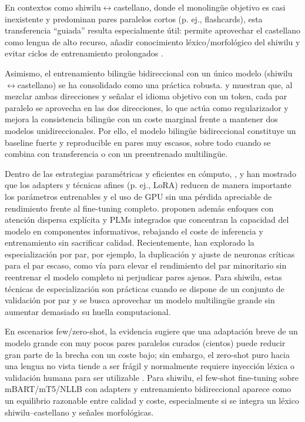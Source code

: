 \documentclass[12pt,a4paper,oneside]{book}
\begin{document}
En contextos como shiwilu$\leftrightarrow$castellano, donde el monolingüe objetivo es casi inexistente y predominan pares paralelos cortos (p. ej., flashcards), esta transferencia ``guiada'' resulta especialmente útil: permite aprovechar el castellano como lengua de alto recurso, añadir conocimiento léxico/morfológico del shiwilu y evitar ciclos de entrenamiento prolongados \parencite{montoya2019}.

Asimismo, el entrenamiento bilingüe bidireccional con un único modelo (shiwilu$\leftrightarrow$castellano) se ha consolidado como una práctica robusta. \textcite{liu2020mbart} y \textcite{desilva2024} muestran que, al mezclar ambas direcciones y señalar el idioma objetivo con un token, cada par paralelo se aprovecha en las dos direcciones, lo que actúa como regularizador y mejora la consistencia bilingüe con un coste marginal frente a mantener dos modelos unidireccionales. Por ello, el modelo bilingüe bidireccional constituye un baseline fuerte y reproducible en pares muy escasos, sobre todo cuando se combina con transferencia o con un preentrenado multilingüe.

Dentro de las estrategias paramétricas y eficientes en cómputo, \textcite{houlsby2019}, \textcite{hu2022lora} y \textcite{chronopoulou2023} han mostrado que los adapters y técnicas afines (p. ej., LoRA) reducen de manera importante los parámetros entrenables y el uso de GPU sin una pérdida apreciable de rendimiento frente al fine-tuning completo. \textcite{ning2024} proponen además enfoques con atención dispersa explícita y PLMs integrados que concentran la capacidad del modelo en componentes informativos, rebajando el coste de inferencia y entrenamiento sin sacrificar calidad. Recientemente, \textcite{qorbani2025} han explorado la especialización por par, por ejemplo, la duplicación y ajuste de neuronas críticas para el par escaso, como vía para elevar el rendimiento del par minoritario sin reentrenar el modelo completo ni perjudicar pares ajenos. Para shiwilu, estas técnicas de especialización son prácticas cuando se dispone de un conjunto de validación por par y se busca aprovechar un modelo multilingüe grande sin aumentar demasiado su huella computacional.

En escenarios few/zero-shot, la evidencia sugiere que una adaptación breve de un modelo grande con muy pocos pares paralelos curados (cientos) puede reducir gran parte de la brecha con un coste bajo; sin embargo, el zero-shot puro hacia una lengua no vista tiende a ser frágil y normalmente requiere inyección léxica o validación humana para ser utilizable \parencite{liu2020mbart,nllb2022}. Para shiwilu, el few-shot fine-tuning sobre mBART/mT5/NLLB con adapters y entrenamiento bidireccional aparece como un equilibrio razonable entre calidad y coste, especialmente si se integra un léxico shiwilu--castellano y señales morfológicas.
\end{document}
